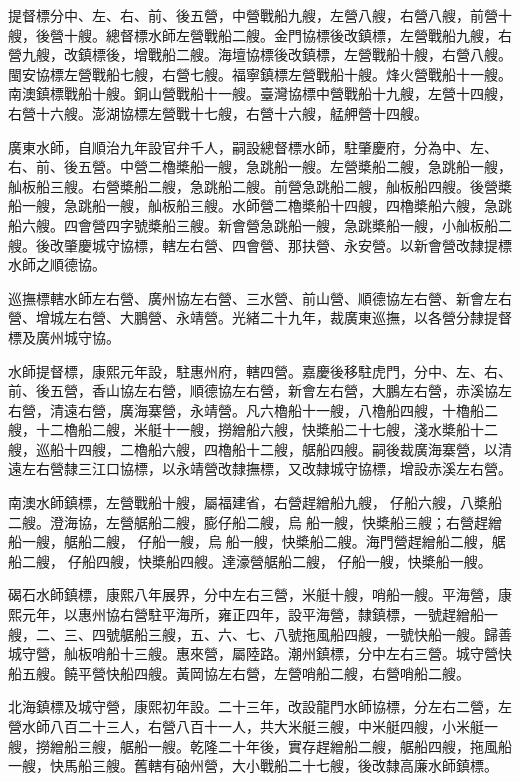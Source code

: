 \begin{pinyinscope}
提督標分中、左、右、前、後五營，中營戰船九艘，左營八艘，右營八艘，前營十艘，後營十艘。總督標水師左營戰船二艘。金門協標後改鎮標，左營戰船九艘，右營九艘，改鎮標後，增戰船二艘。海壇協標後改鎮標，左營戰船十艘，右營八艘。閩安協標左營戰船七艘，右營七艘。福寧鎮標左營戰船十艘。烽火營戰船十一艘。南澳鎮標戰船十艘。銅山營戰船十一艘。臺灣協標中營戰船十九艘，左營十四艘，右營十六艘。澎湖協標左營戰十七艘，右營十六艘，艋舺營十四艘。

廣東水師，自順治九年設官弁千人，嗣設總督標水師，駐肇慶府，分為中、左、右、前、後五營。中營二櫓槳船一艘，急跳船一艘。左營槳船二艘，急跳船一艘，舢板船三艘。右營槳船二艘，急跳船二艘。前營急跳船二艘，舢板船四艘。後營槳船一艘，急跳船一艘，舢板船三艘。水師營二櫓槳船十四艘，四櫓槳船六艘，急跳船六艘。四會營四字號槳船三艘。新會營急跳船一艘，急跳槳船一艘，小舢板船二艘。後改肇慶城守協標，轄左右營、四會營、那扶營、永安營。以新會營改隸提標水師之順德協。

巡撫標轄水師左右營、廣州協左右營、三水營、前山營、順德協左右營、新會左右營、增城左右營、大鵬營、永靖營。光緒二十九年，裁廣東巡撫，以各營分隸提督標及廣州城守協。

水師提督標，康熙元年設，駐惠州府，轄四營。嘉慶後移駐虎門，分中、左、右、前、後五營，香山協左右營，順德協左右營，新會左右營，大鵬左右營，赤溪協左右營，清遠右營，廣海寨營，永靖營。凡六櫓船十一艘，八櫓船四艘，十櫓船二艘，十二櫓船二艘，米艇十一艘，撈繒船六艘，快槳船二十七艘，淺水槳船十二艘，巡船十四艘，二櫓船六艘，四櫓船十二艘，艍船四艘。嗣後裁廣海寨營，以清遠左右營隸三江口協標，以永靖營改隸撫標，又改隸城守協標，增設赤溪左右營。

南澳水師鎮標，左營戰船十艘，屬福建省，右營趕繒船九艘，仔船六艘，八槳船二艘。澄海協，左營艍船二艘，膨仔船二艘，烏船一艘，快槳船三艘；右營趕繒船一艘，艍船二艘，仔船一艘，烏船一艘，快槳船二艘。海門營趕繒船二艘，艍船二艘，仔船四艘，快槳船四艘。達濠營艍船二艘，仔船一艘，快槳船一艘。

碣石水師鎮標，康熙八年展界，分中左右三營，米艇十艘，哨船一艘。平海營，康熙元年，以惠州協右營駐平海所，雍正四年，設平海營，隸鎮標，一號趕繒船一艘，二、三、四號艍船三艘，五、六、七、八號拖風船四艘，一號快船一艘。歸善城守營，舢板哨船十三艘。惠來營，屬陸路。潮州鎮標，分中左右三營。城守營快船五艘。饒平營快船四艘。黃岡協左右營，左營哨船二艘，右營哨船二艘。

北海鎮標及城守營，康熙初年設。二十三年，改設龍門水師協標，分左右二營，左營水師八百二十三人，右營八百十一人，共大米艇三艘，中米艇四艘，小米艇一艘，撈繒船三艘，艍船一艘。乾隆二十年後，實存趕繒船二艘，艍船四艘，拖風船一艘，快馬船三艘。舊轄有硇州營，大小戰船二十七艘，後改隸高廉水師鎮標。


\end{pinyinscope}
